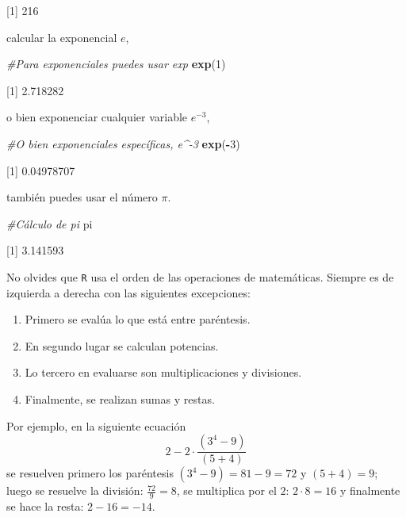 \documentclass[
]{book}
\newenvironment{Shaded}{\begin{snugshade}}{\end{snugshade}}
\newcommand{\CommentTok}[1]{\textcolor[rgb]{0.56,0.35,0.01}{\textit{#1}}}
\newcommand{\DecValTok}[1]{\textcolor[rgb]{0.00,0.00,0.81}{#1}}
\newcommand{\KeywordTok}[1]{\textcolor[rgb]{0.13,0.29,0.53}{\textbf{#1}}}
\newcommand{\NormalTok}[1]{#1}
\newcommand{\OperatorTok}[1]{\textcolor[rgb]{0.81,0.36,0.00}{\textbf{#1}}}
\begin{document}
{[}1{]} 216

calcular la exponencial \(e\),

\begin{Shaded}
\begin{Highlighting}[]
\CommentTok{#Para exponenciales puedes usar exp}
\KeywordTok{exp}\NormalTok{(}\DecValTok{1}\NormalTok{)}
\end{Highlighting}
\end{Shaded}

{[}1{]} 2.718282

o bien exponenciar cualquier variable \(e^{-3}\),

\begin{Shaded}
\begin{Highlighting}[]
\CommentTok{#O bien exponenciales específicas, e^-3}
\KeywordTok{exp}\NormalTok{(}\OperatorTok{-}\DecValTok{3}\NormalTok{)}
\end{Highlighting}
\end{Shaded}

{[}1{]} 0.04978707

también puedes usar el número \(\pi\).

\begin{Shaded}
\begin{Highlighting}[]
\CommentTok{#Cálculo de pi}
\NormalTok{pi}
\end{Highlighting}
\end{Shaded}

{[}1{]} 3.141593

No olvides que \texttt{R} usa el orden de las operaciones de matemáticas. Siempre es de izquierda a derecha con las siguientes excepciones:

\begin{enumerate}
\def\labelenumi{\arabic{enumi}.}
\item
  Primero se evalúa lo que está entre paréntesis.
\item
  En segundo lugar se calculan potencias.
\item
  Lo tercero en evaluarse son multiplicaciones y divisiones.
\item
  Finalmente, se realizan sumas y restas.
\end{enumerate}

Por ejemplo, en la siguiente ecuación
\[
2 - 2 \cdot \frac{(3^4 - 9)}{(5 + 4)}
\]
se resuelven primero los paréntesis \((3^4 - 9) = 81 - 9 = 72\) y \((5 + 4) = 9\); luego se resuelve la división: \(\frac{72}{9}=8\), se multiplica por el \(2\): \(2 \cdot 8 = 16\) y finalmente se hace la resta: \(2-16 = -14\).
\end{document}
